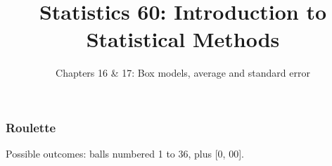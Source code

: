 \documentclass[handout]{beamer}
\title{Statistics 60: Introduction to Statistical Methods}
\subtitle{Chapters 16 \& 17: Box models, average and standard error}
\author{}%
\begin{document}
   \begin{frame}
   \titlepage
   \end{frame}



   \begin{frame}
   \frametitle{Roulette}
   \begin{center}
   \end{center}
   Possible outcomes: balls numbered 1 to 36, plus [0, 00].
   \end{frame}
\end{document}
